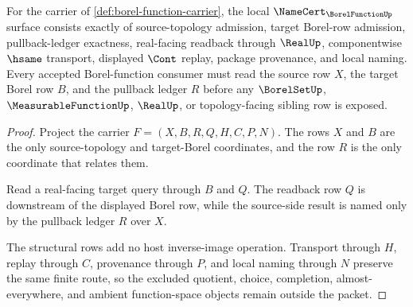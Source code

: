 \begin{theorem}
\label{thm:borel-function-namecert-obligations}
For the carrier of \autoref{def:borel-function-carrier}, the local $\NameCert_{\BorelFunctionUp}$ surface consists exactly of source-topology admission, target Borel-row admission, pullback-ledger exactness, real-facing readback through $\RealUp$, componentwise $\hsame$ transport, displayed $\Cont$ replay, package provenance, and local naming. Every accepted Borel-function consumer must read the source row $X$, the target Borel row $B$, and the pullback ledger $R$ before any $\BorelSetUp$, $\MeasurableFunctionUp$, $\RealUp$, or topology-facing sibling row is exposed.
\end{theorem}
\begin{proof}
Project the carrier $F=(X,B,R,Q,H,C,P,N)$. The rows $X$ and $B$ are the only source-topology and target-Borel coordinates, and the row $R$ is the only coordinate that relates them.

Read a real-facing target query through $B$ and $Q$. The readback row $Q$ is downstream of the displayed Borel row, while the source-side result is named only by the pullback ledger $R$ over $X$.

The structural rows add no host inverse-image operation. Transport through $H$, replay through $C$, provenance through $P$, and local naming through $N$ preserve the same finite route, so the excluded quotient, choice, completion, almost-everywhere, and ambient function-space objects remain outside the packet.
\end{proof}

